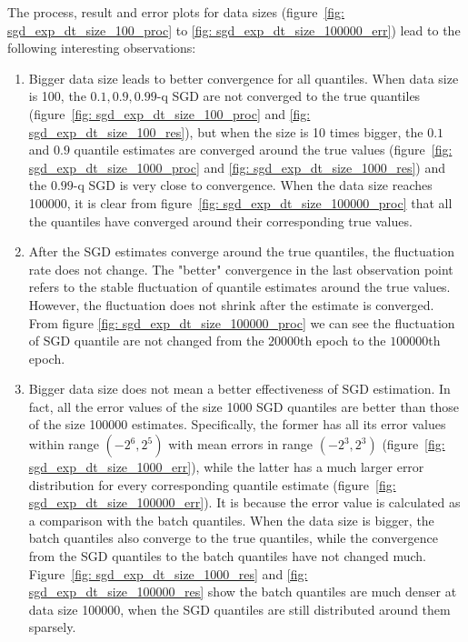 The process, result and error plots for data sizes (figure~\ref{fig: sgd_exp_dt_size_100_proc} to \ref{fig: sgd_exp_dt_size_100000_err}) lead to the following interesting observations:
\begin{enumerate}
    \item Bigger data size leads to better convergence for all quantiles. When data size is 100, the $0.1, 0.9, 0.99$-q SGD are not converged to the true quantiles (figure~\ref{fig: sgd_exp_dt_size_100_proc} and \ref{fig: sgd_exp_dt_size_100_res}), but when the size is 10 times bigger, the $0.1$ and $0.9$ quantile estimates are converged around the true values (figure~\ref{fig: sgd_exp_dt_size_1000_proc} and \ref{fig: sgd_exp_dt_size_1000_res}) and the $0.99$-q SGD is very close to convergence. When the data size reaches 100000, it is clear from figure~\ref{fig: sgd_exp_dt_size_100000_proc} that all the quantiles have converged around their corresponding true values.
    
    \item After the SGD estimates converge around the true quantiles, the fluctuation rate does not change. The "better" convergence in the last observation point refers to the stable fluctuation of quantile estimates around the true values. However, the fluctuation does not shrink after the estimate is converged. From figure \ref{fig: sgd_exp_dt_size_100000_proc} we can see the fluctuation of SGD quantile are not changed from the $20000$th epoch to the $100000$th epoch.
    
    \item Bigger data size does not mean a better effectiveness of SGD estimation. In fact, all the error values of the size 1000 SGD quantiles are better than those of the size 100000 estimates. Specifically, the former has all its error values within range $(-2^6, 2^5)$ with mean errors in range $(-2^3, 2^3)$ (figure~\ref{fig: sgd_exp_dt_size_1000_err}), while the latter has a much larger error distribution for every corresponding quantile estimate (figure~\ref{fig: sgd_exp_dt_size_100000_err}). It is because the error value is calculated as a comparison with the batch quantiles. When the data size is bigger, the batch quantiles also converge to the true quantiles, while the convergence from the SGD quantiles to the batch quantiles have not changed much. Figure~\ref{fig: sgd_exp_dt_size_1000_res} and \ref{fig: sgd_exp_dt_size_100000_res} show the batch quantiles are much denser at data size 100000, when the SGD quantiles are still distributed around them sparsely.
\end{enumerate}
